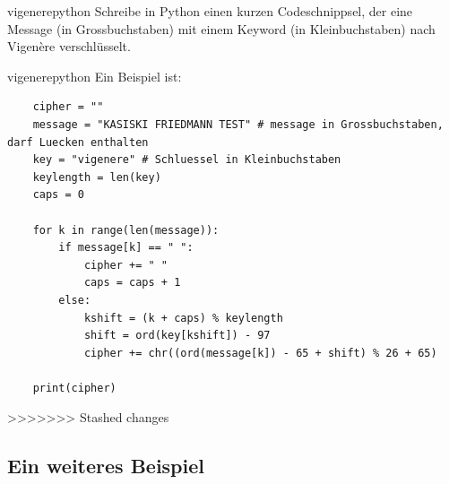 \documentclass[%
<<<<<<< Updated upstream
11pt,%
twoside,%
titlepage,%
german,%
headsepline%
]{scrartcl}
\begin{document}
\begin{uebenv}{vigenerepython}
    Schreibe in Python einen kurzen Codeschnippsel, der eine Message (in Grossbuchstaben) mit einem Keyword (in Kleinbuchstaben) nach Vigen\`ere verschlüsselt.
\end{uebenv}

\begin{lsg}{vigenerepython}
Ein Beispiel ist:
 
\begin{lstlisting}
    cipher = ""
    message = "KASISKI FRIEDMANN TEST" # message in Grossbuchstaben, darf Luecken enthalten
    key = "vigenere" # Schluessel in Kleinbuchstaben
    keylength = len(key)
    caps = 0

    for k in range(len(message)):
        if message[k] == " ":
            cipher += " "
            caps = caps + 1
        else:
            kshift = (k + caps) % keylength
            shift = ord(key[kshift]) - 97
            cipher += chr((ord(message[k]) - 65 + shift) % 26 + 65)
            
    print(cipher)
\end{lstlisting}
\end{lsg}

>>>>>>> Stashed changes
\subsection{Ein weiteres Beispiel}
\end{document}
